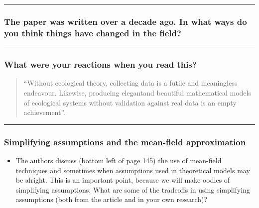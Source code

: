 \documentclass[
]{article}
\providecommand{\tightlist}{%
  \setlength{\itemsep}{0pt}\setlength{\parskip}{0pt}}
\begin{document}
\begin{center}\rule{0.5\linewidth}{0.5pt}\end{center}

\hypertarget{the-paper-was-written-over-a-decade-ago.-in-what-ways-do-you-think-things-have-changed-in-the-field}{%
\subsubsection{The paper was written over a decade ago. In what ways do
you think things have changed in the
field?}\label{the-paper-was-written-over-a-decade-ago.-in-what-ways-do-you-think-things-have-changed-in-the-field}}

\begin{center}\rule{0.5\linewidth}{0.5pt}\end{center}

\hypertarget{what-were-your-reactions-when-you-read-this}{%
\subsubsection{What were your reactions when you read
this?}\label{what-were-your-reactions-when-you-read-this}}

\begin{quote}
``Without ecological theory, collecting data is a futile and meaningless
endeavour. Likewise, producing elegantand beautiful mathematical models
of ecological systems without validation against real data is an empty
achievement''.
\end{quote}

\begin{center}\rule{0.5\linewidth}{0.5pt}\end{center}

\hypertarget{simplifying-assumptions-and-the-mean-field-approximation}{%
\subsubsection{Simplifying assumptions and the mean-field
approximation}\label{simplifying-assumptions-and-the-mean-field-approximation}}

\begin{itemize}
\tightlist
\item
  The authors discuss (bottom left of page 145) the use of mean-field
  techniques and sometimes when assumptions used in theoretical models
  may be alright. This is an important point, because we will make
  oodles of simplifying assumptions. What are some of the tradeoffs in
  using simplifying assumptions (both from the article and in your own
  research)?
\end{itemize}
\end{document}
